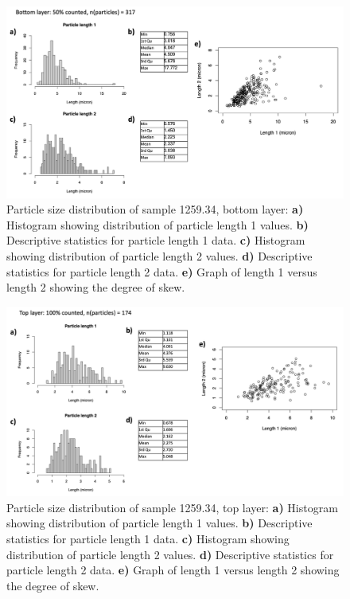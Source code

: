 \begin{figure}[H]
\centering
  \includegraphics[width=\linewidth]{1259-34_partsize_2}
\caption[Particle size distribution, sample 1259.34, bottom layer.]{Particle size distribution of sample 1259.34, bottom layer: \textbf{a)} Histogram showing distribution of particle length 1 values. \textbf{b)} Descriptive statistics for particle length 1 data. \textbf{c)} Histogram showing distribution of particle length 2 values. \textbf{d)} Descriptive statistics for particle length 2 data. \textbf{e)} Graph of length 1 versus length 2 showing the degree of skew.}
\label{fig:1259.34_partsize_2}
\end{figure}

\begin{figure}[H]
\centering
  \includegraphics[width=\linewidth]{1259-34_partsize}
\caption[Particle size distribution, sample 1259.34, top layer.]{Particle size distribution of sample 1259.34, top layer: \textbf{a)} Histogram showing distribution of particle length 1 values. \textbf{b)} Descriptive statistics for particle length 1 data. \textbf{c)} Histogram showing distribution of particle length 2 values. \textbf{d)} Descriptive statistics for particle length 2 data. \textbf{e)} Graph of length 1 versus length 2 showing the degree of skew.}
\label{fig:1259.34_partsize_1}
\end{figure}


